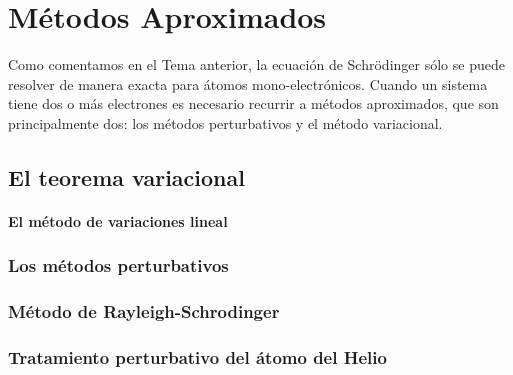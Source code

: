 \chapter{Métodos Aproximados}
Como comentamos en el Tema anterior, la ecuación de Schrödinger 
sólo se puede resolver de manera exacta para átomos mono-electrónicos.
Cuando un sistema tiene dos o más electrones es necesario recurrir
a métodos aproximados, que son principalmente dos: los métodos 
perturbativos y el método variacional. 

\section{El teorema variacional}
\subsubsection{El método de variaciones lineal}
\subsection{Los métodos perturbativos}
\subsection{Método de Rayleigh-Schrodinger}
\subsection{Tratamiento perturbativo del átomo del Helio}


